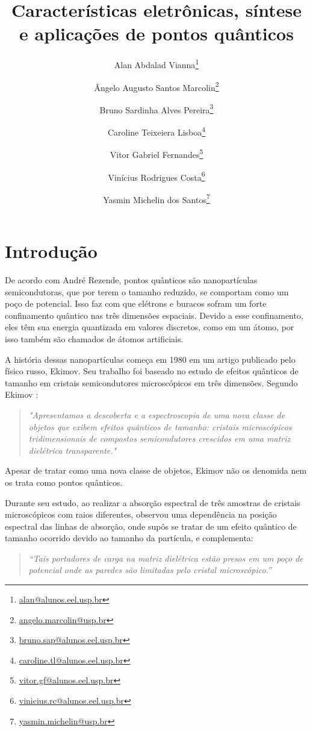 \documentclass[11pt]{article}
\title{Características eletrônicas, síntese e aplicações de pontos quânticos}
\author[1]{Alan Abdalad Vianna\footnote{\href{mailto:alan@alunos.eel.usp.br}{alan@alunos.eel.usp.br}}}
\author[1]{Ângelo Augusto Santos Marcolin\footnote{\href{mailto:angelo.marcolin@usp.br}{angelo.marcolin@usp.br}} }
\author[1]{Bruno Sardinha Alves Pereira\footnote{\href{mailto:bruno.sap@alunos.eel.usp.br}{bruno.sap@alunos.eel.usp.br}} }
\author[1]{Caroline Teixeiera Lisboa\footnote{\href{mailto:caroline.tl@alunos.eel.usp.br}{caroline.tl@alunos.eel.usp.br}} }
\author[1]{Vitor Gabriel Fernandes\footnote{\href{mailto:vitor.gf@alunos.eel.usp.br}{vitor.gf@alunos.eel.usp.br}} }
\author[1]{Vinícius Rodrigues Costa\footnote{\href{mailto:vinicius.rc@alunos.eel.usp.br}{vinicius.rc@alunos.eel.usp.br}} }
\author[1]{Yasmin Michelin dos Santos\footnote{\href{mailto:yasmin.michelin@usp.br}{yasmin.michelin@usp.br}} }
\affil[1]{Escola de Engenharia de Lorena\\
Universidade de São Paulo\\
12602-810, Lorena, SP, Brasil}
\numberwithin{equation}{section}
\begin{document}
\onehalfspacing

\maketitle


\tableofcontents

\section{Introdução}


\par De acordo com André Rezende\cite{introducao1}, pontos quânticos são nanopartículas semicondutoras, que por terem o tamanho reduzido, se comportam como um poço de potencial. Isso faz com que elétrons e buracos sofram um forte confinamento quântico nas três dimensões espaciais. Devido a esse confinamento, eles têm sua energia quantizada em valores discretos, como em um átomo, por isso também são chamados de átomos artificiais.

\par A história dessas nanopartículas começa em 1980 em um artigo publicado pelo físico russo, Ekimov. Seu trabalho foi baseado no estudo de efeitos quânticos de tamanho em cristais semicondutores microscópicos em três dimensões. Segundo Ekimov \cite{introducao2}:

\begin{quote}
\textit{"Apresentamos a descoberta e a espectroscopia de uma nova classe de objetos que exibem efeitos quânticos de tamanho: cristais microscópicos tridimensionais de compostos semicondutores crescidos em uma matriz dielétrica transparente."}
\end{quote}

\par Apesar de tratar como uma nova classe de objetos, Ekimov não os denomida nem os trata como pontos quânticos.

\par Durante seu estudo, ao realizar a absorção espectral de três amostras de cristais microscópicos com raios diferentes, observou uma dependência na posição espectral das linhas de absorção, onde supôs se tratar de um efeito quântico de tamanho ocorrido devido ao tamanho da partícula, e complementa:

\begin{quote}
\textit{“Tais portadores de carga na matriz dielétrica estão presos em um poço de potencial onde as paredes são limitadas pelo cristal microscópico.”}
\end{quote}
\end{document}
